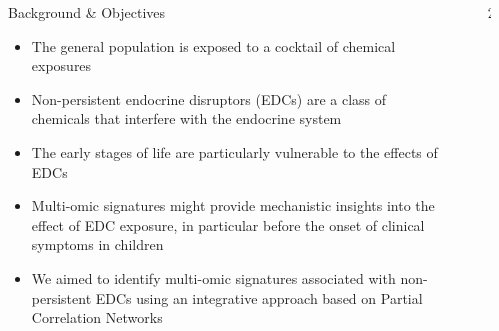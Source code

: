 \documentclass[final]{beamer}
\newlength{\sepwidth}
\newlength{\colwidth}
\newcommand{\separatorcolumn}{\begin{column}{\sepwidth}\end{column}}
\begin{document}
\begin{frame}[t]
\begin{columns}[t]
\separatorcolumn

\begin{column}{\colwidth}

  \begin{block}{Background \& Objectives}
  	\begin{itemize}
  		\item The general population is exposed to a cocktail of chemical exposures
  		\item Non-persistent endocrine disruptors (EDCs) are a class of chemicals that interfere with the endocrine system
  		\item The early stages of life are particularly vulnerable to the effects of EDCs
  		\item Multi-omic signatures might provide mechanistic insights into the effect of EDC exposure, in particular before the onset of clinical symptoms in children
  		\item We aimed to identify multi-omic signatures associated with non-persistent EDCs using an integrative approach based on Partial Correlation Networks
  	\end{itemize}
  \end{block}

\end{column}

\separatorcolumn

\begin{column}{2\colwidth}


\end{column}
\end{columns}
\end{frame}
\end{document}
